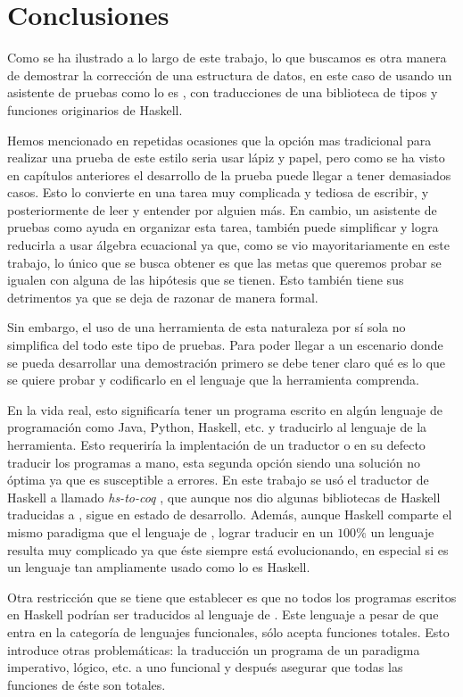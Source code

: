 \chapter*{Conclusiones}
Como se ha ilustrado a lo largo de este trabajo, lo que buscamos es otra manera de demostrar la 
correcci\'on de una estructura de datos, en este caso de {\arns} usando un asistente de pruebas 
como lo es {\coq}, con traducciones de una biblioteca de tipos y funciones originarios de Haskell.

Hemos mencionado en repetidas ocasiones que la opci\'on mas tradicional para realizar una prueba de 
este estilo seria usar lápiz y papel, pero como se ha visto en capítulos anteriores el desarrollo de
la prueba puede llegar a tener demasiados casos. Esto lo convierte en una tarea muy complicada y 
tediosa de escribir, y posteriormente de leer y entender por alguien m\'as. En cambio, un asistente de 
pruebas como {\coq} ayuda en organizar esta tarea, también puede simplificar y logra reducirla a usar álgebra 
ecuacional ya que, como se vio mayoritariamente en este trabajo, lo \'unico que se busca obtener es que las metas que 
queremos probar se igualen con alguna de las hip\'otesis que se tienen. 
Esto también tiene sus detrimentos ya que se deja de razonar de manera formal.

Sin embargo, el uso de una herramienta de esta naturaleza por s\'i sola no simplifica del todo este
tipo de pruebas. Para poder llegar a un escenario donde se pueda desarrollar una 
demostraci\'on primero se debe tener claro qué es lo que se quiere probar y codificarlo en el 
lenguaje que la herramienta comprenda.

En la vida real, esto significaría tener un programa escrito en algún lenguaje de programaci\'on
como Java, Python, Haskell, etc. y traducirlo al lenguaje de la herramienta. Esto requeriría la
implentaci\'on de un traductor o en su defecto traducir los programas a mano, esta segunda opci\'on
siendo una soluci\'on no \'optima ya que es susceptible a errores. En este trabajo se us\'o el
traductor de Haskell a {\coq} llamado \textit{hs-to-coq} \cite{thrc}, que aunque nos dio algunas 
bibliotecas de Haskell traducidas a {\coq}, sigue en estado de desarrollo. Adem\'as, aunque Haskell 
comparte el mismo paradigma que el lenguaje de {\coq}, lograr traducir en un $100\%$ un lenguaje 
resulta muy complicado ya que \'este siempre est\'a evolucionando, en especial si es un lenguaje tan 
ampliamente usado como lo es Haskell.

Otra restricci\'on que se tiene que establecer es que no todos los programas escritos en Haskell 
podrían ser traducidos al lenguaje de {\coq}. Este lenguaje a pesar de que entra en la categoría de 
lenguajes funcionales, s\'olo acepta funciones totales. Esto introduce otras 
problemáticas: la traducción un programa de un paradigma imperativo, l\'ogico, etc. a uno funcional 
y después asegurar que todas las funciones de \'este son totales.

